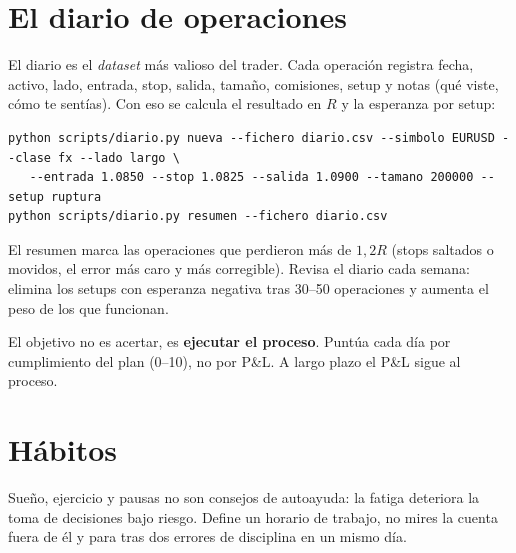 \section{El diario de operaciones}
El diario es el \emph{dataset} más valioso del trader. Cada operación registra fecha, activo, lado,
entrada, stop, salida, tamaño, comisiones, setup y notas (qué viste, cómo te sentías). Con eso se
calcula el resultado en $R$ y la esperanza por setup:
\begin{lstlisting}
python scripts/diario.py nueva --fichero diario.csv --simbolo EURUSD --clase fx --lado largo \
   --entrada 1.0850 --stop 1.0825 --salida 1.0900 --tamano 200000 --setup ruptura
python scripts/diario.py resumen --fichero diario.csv
\end{lstlisting}
El resumen marca las operaciones que perdieron más de $1{,}2R$ (stops saltados o movidos, el error más
caro y más corregible). Revisa el diario cada semana: elimina los setups con esperanza negativa tras
30--50 operaciones y aumenta el peso de los que funcionan.

\begin{clave}
El objetivo no es acertar, es \textbf{ejecutar el proceso}. Puntúa cada día por cumplimiento del plan
(0--10), no por P\&L. A largo plazo el P\&L sigue al proceso.
\end{clave}

\section{Hábitos}
Sueño, ejercicio y pausas no son consejos de autoayuda: la fatiga deteriora la toma de decisiones bajo
riesgo. Define un horario de trabajo, no mires la cuenta fuera de él y para tras dos errores de
disciplina en un mismo día.
